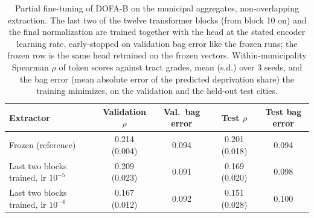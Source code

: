\begin{table}[htbp]
\centering
\caption{Partial fine-tuning of DOFA-B on the municipal aggregates, non-overlapping extraction. The last two of the twelve transformer blocks (from block 10 on) and the final normalization are trained together with the head at the stated encoder learning rate, early-stopped on validation bag error like the frozen runs; the frozen row is the same head retrained on the frozen vectors. Within-municipality Spearman $\rho$ of token scores against tract grades, mean (s.d.) over 3 seeds, and the bag error (mean absolute error of the predicted deprivation share) the training minimizes, on the validation and the held-out test cities.}
\small
\begin{tabular}{lcccc}
\toprule
Extractor & Validation $\rho$ & Val.\ bag error & Test $\rho$ & Test bag error\\
\midrule
Frozen (reference) & 0.214 (0.004) & 0.094 & 0.201 (0.018) & 0.094\\
Last two blocks trained, lr $10^{-5}$ & 0.209 (0.023) & 0.091 & 0.169 (0.020) & 0.098\\
Last two blocks trained, lr $10^{-4}$ & 0.167 (0.012) & 0.092 & 0.151 (0.028) & 0.100\\
\bottomrule
\end{tabular}
\label{tab:finetune}
\end{table}
